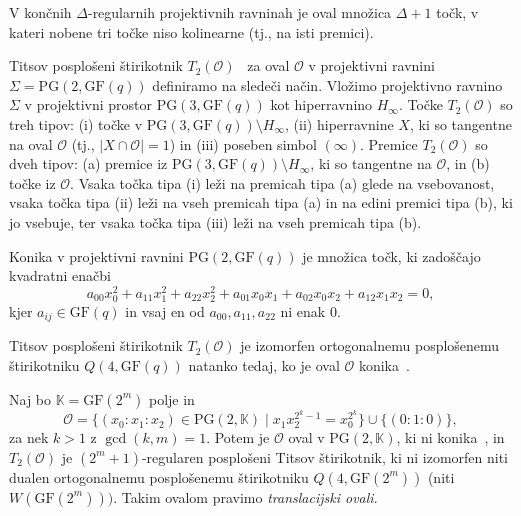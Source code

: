\documentclass[fin1, tisk]{fmfdelo}
\newcommand{\OO}{\mathcal{O}}
\newcommand{\PG}{\mathrm{PG}}
\newcommand{\GF}{\mathrm{GF}}
\begin{document}
\begin{opomba}
    V končnih $\Delta$-regularnih projektivnih ravninah je oval množica $\Delta + 1$ točk, v kateri nobene tri točke niso kolinearne
    (tj., na isti premici). 
\end{opomba}

\begin{definicija}
    Titsov posplošeni štirikotnik $T_2(\OO)$~\cite{o2001subquadrangles} za oval $\OO$ v projektivni ravnini $\Sigma = \PG(2, \GF(q))$ definiramo na sledeči način.
    Vložimo projektivno ravnino $\Sigma$ v projektivni prostor $\PG(3, \GF(q))$ kot hiperravnino $H_\infty$. 
    Točke $T_2(\OO)$ so treh tipov: (i) točke v $\PG(3, \GF(q))\setminus H_\infty$, (ii) hiperravnine $X$, ki so tangentne na oval $\OO$ (tj., $|X\cap\OO|=1$)
    in (iii) poseben simbol $(\infty)$.
    Premice $T_2(\OO)$ so dveh tipov: (a) premice iz $\PG(3, \GF(q))\setminus H_\infty$, ki so tangentne na $\OO$, in (b) točke iz $\OO$.
    Vsaka točka tipa (i) leži na premicah tipa (a) glede na vsebovanost, vsaka točka tipa (ii) leži 
    na vseh premicah tipa (a) in na edini premici tipa (b), ki jo vsebuje, ter vsaka točka tipa (iii) leži na vseh premicah tipa (b).
\end{definicija}

\begin{definicija}
    Konika v projektivni ravnini $\PG(2, \GF(q))$ je množica točk, ki zadoščajo kvadratni enačbi
    $$a_{00}x_0^2 + a_{11}x_1^2 + a_{22}x_2^2 + a_{01}x_0x_1 + a_{02}x_0x_2 + a_{12}x_1x_2 = 0,$$
    kjer $a_{ij}\in \GF(q)$ in vsaj en od $a_{00}, a_{11}, a_{22}$ ni enak $0$.
\end{definicija}

\begin{trditev}
    Titsov posplošeni štirikotnik $T_2(\OO)$ je izomorfen ortogonalnemu posplošenemu štirikotniku $Q(4, \GF(q))$ natanko tedaj, 
    ko je oval $\OO$ konika~\cite{o2001subquadrangles}.
\end{trditev}

\begin{opomba}
    Naj bo $\mathbb{K} = \GF(2^m)$ polje in $$\OO = \{(x_0 : x_1 : x_2)\in \PG(2, \mathbb{K})\mid x_1x_2^{2^k - 1} = x_0^{2^k}\}\cup\{(0:1:0)\},$$
    za nek $k>1$ z $\gcd(k, m) = 1$. Potem je $\OO$ oval v $\PG(2, \mathbb{K})$, ki ni konika~\cite{enwiki1365862542}, in $T_2(\OO)$ 
    je $(2^m + 1)$-regularen posplošeni Titsov štirikotnik, ki ni izomorfen niti 
    dualen ortogonalnemu posplošenemu štirikotniku $Q(4, \GF(2^m))$ (niti $W(\GF(2^m)))$.
    Takim ovalom pravimo \emph{translacijski ovali}.
\end{opomba}
\end{document}
